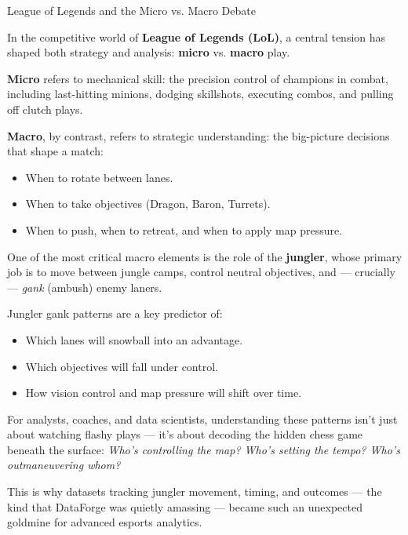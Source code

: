 \begin{HistoricalSidebar}{League of Legends and the Micro vs. Macro Debate}

    In the competitive world of \textbf{League of Legends (LoL)}, a central tension has shaped both strategy and analysis:  
    \textbf{micro} vs. \textbf{macro} play.
    
    \medskip
    
    \textbf{Micro} refers to mechanical skill: the precision control of champions in combat, including last-hitting minions, dodging skillshots, executing combos, and pulling off clutch plays.

    \medskip
    
    \textbf{Macro}, by contrast, refers to strategic understanding: the big-picture decisions that shape a match:

    \medskip

    \begin{itemize}
        \item When to rotate between lanes.
        \item When to take objectives (Dragon, Baron, Turrets).
        \item When to push, when to retreat, and when to apply map pressure.
    \end{itemize}
    
    \medskip
    
    One of the most critical macro elements is the role of the \textbf{jungler}, whose primary job is to move between jungle camps, control neutral objectives, and — crucially — \textit{gank} (ambush) enemy laners.  

    \medskip
    
    Jungler gank patterns are a key predictor of:

    \medskip

    \begin{itemize}
        \item Which lanes will snowball into an advantage.
        \item Which objectives will fall under control.
        \item How vision control and map pressure will shift over time.
    \end{itemize}
    
    \medskip
    
    For analysts, coaches, and data scientists, understanding these patterns isn’t just about watching flashy plays — it’s about decoding the hidden chess game beneath the surface:
    \textit{Who’s controlling the map? Who’s setting the tempo? Who’s outmaneuvering whom?}
    
    \medskip

    This is why datasets tracking jungler movement, timing, and outcomes — the kind that DataForge was quietly amassing — became such an unexpected goldmine for advanced esports analytics.
    
\end{HistoricalSidebar}
    
